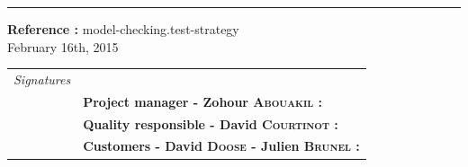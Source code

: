 \documentclass{report}
\begin{document}
\begin{titlepage}


\vspace*{4.5cm}

\noindent
\begin{minipage}{0.35\linewidth}
    \begin{flushright}
        \printauthor
    \end{flushright}
\end{minipage} \hspace{15pt}
%
\begin{minipage}{0.02\linewidth}
    \rule{1pt}{175pt}
\end{minipage} \hspace{-10pt}
%
\begin{minipage}{0.6\linewidth}
\vspace{5pt}
\newenvironment{test}{\begin{center}}{\end{center}}
\hspace{10pt}
\begin{minipage}{\linewidth} 
\textbf{Reference :} model-checking.test-strategy ~\\
February 16th, 2015
\end{minipage}
\end{minipage}

\vspace{8cm}
\begin{minipage}{0.20\linewidth}
    \begin{flushright}
       
        \begin{tabular}{ll}
	 \textit{Signatures} & \\
			& \textbf{Project manager - Zohour \textsc{Abouakil} :} \\
            & \textbf{Quality responsible - David \textsc{Courtinot} :} \\
            & \textbf{Customers - David \textsc{Doose} - Julien \textsc{Brunel} :} \\
        \end{tabular}
    \end{flushright}
\end{minipage}

\end{titlepage}
\restoregeometry
\tableofcontents
{}
\end{document}
